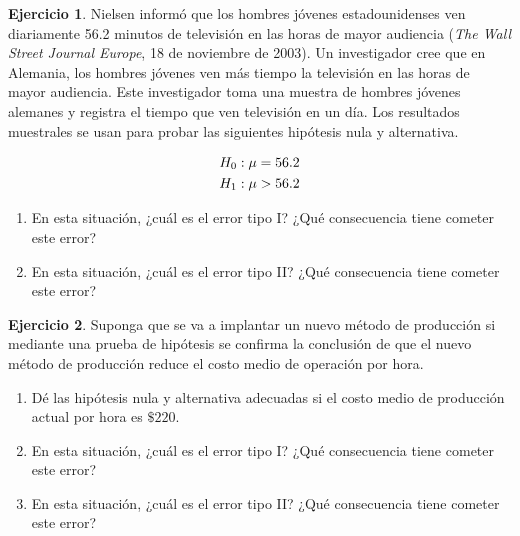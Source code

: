 \documentclass[
  11pt,
]{book}
\providecommand{\tightlist}{%
  \setlength{\itemsep}{0pt}\setlength{\parskip}{0pt}}
\theoremstyle{definition}
\theoremstyle{definition}
\theoremstyle{definition}
\newtheorem{exercise}{Ejercicio}[chapter]
\theoremstyle{definition}
\theoremstyle{remark}
\begin{document}
\begin{exercise}

Nielsen informó que los hombres jóvenes estadounidenses ven diariamente 56.2 minutos de televisión en las horas de mayor audiencia (\emph{The Wall Street Journal Europe}, 18 de noviembre de 2003). Un investigador cree que en Alemania, los hombres jóvenes ven más tiempo la televisión en las horas de mayor audiencia. Este investigador toma una muestra de hombres jóvenes alemanes y registra el tiempo que ven televisión en un día. Los resultados muestrales se usan para probar las siguientes hipótesis nula y alternativa.

\begin{equation}
\notag
\begin{split}
H_0&: \mu = 56.2\\
H_1&: \mu > 56.2\\
\end{split}
\end{equation}

\begin{enumerate}
\def\labelenumi{\alph{enumi}.}
\tightlist
\item
  En esta situación, ¿cuál es el error tipo I? ¿Qué consecuencia tiene cometer este error?
\item
  En esta situación, ¿cuál es el error tipo II? ¿Qué consecuencia tiene cometer este error?
\end{enumerate}

\end{exercise}

\begin{exercise}

Suponga que se va a implantar un nuevo método de producción si mediante una prueba de hipótesis se confirma la conclusión de que el nuevo método de producción reduce el costo medio de operación por hora.

\begin{enumerate}
\def\labelenumi{\alph{enumi}.}
\tightlist
\item
  Dé las hipótesis nula y alternativa adecuadas si el costo medio de producción actual por hora es \(\$220\).
\item
  En esta situación, ¿cuál es el error tipo I? ¿Qué consecuencia tiene cometer este error?
\item
  En esta situación, ¿cuál es el error tipo II? ¿Qué consecuencia tiene cometer este error?
\end{enumerate}

\end{exercise}
\end{document}
